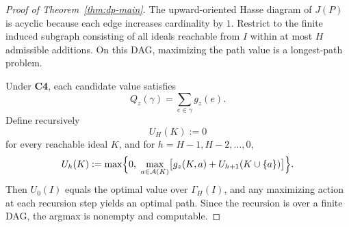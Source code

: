 \documentclass{article}
\theoremstyle{definition}
\begin{document}
\begin{proof}[Proof of Theorem~\ref{thm:dp-main}]
The upward-oriented Hasse diagram of \(J(P)\) is acyclic because each edge increases cardinality by \(1\). Restrict to the finite induced subgraph consisting of all ideals reachable from \(I\) within at most \(H\) admissible additions. On this DAG, maximizing the path value is a longest-path problem.

Under \textbf{C4}, each candidate value satisfies
\[
Q_z(\gamma)=\sum_{e\in\gamma} g_z(e).
\]
Define recursively
\[
U_H(K):=0
\]
for every reachable ideal \(K\), and for \(h=H-1,H-2,\dots,0\),
\begin{equation}
U_h(K):=
\max\Bigl\{
0,\ 
\max_{a\in \mathcal A(K)}
\bigl[g_z(K,a)+U_{h+1}(K\cup\{a\})\bigr]
\Bigr\}.
\label{eq:dp-recursion}
\end{equation}
Then \(U_0(I)\) equals the optimal value over \(\Gamma_H(I)\), and any maximizing action at each recursion step yields an optimal path. Since the recursion is over a finite DAG, the argmax is nonempty and computable.
\end{proof}

% 
\end{document}
